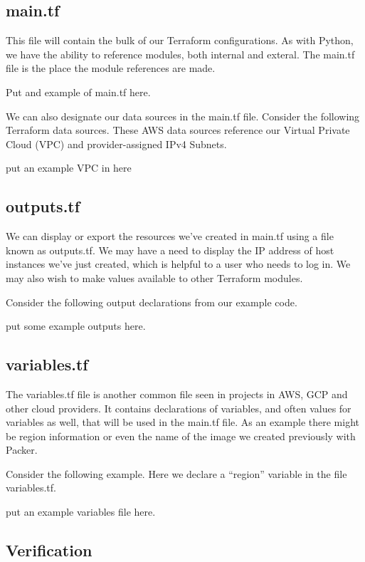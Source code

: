 \subsection{main.tf}

\justify{}
This file will contain the bulk of our Terraform configurations. As with
Python, we have the ability to reference modules, both internal and
exteral. The main.tf file is the place the module references are made.

Put and example of main.tf here.

\justify{}
We can also designate our data sources in the main.tf file. Consider the
following Terraform data sources. These AWS data sources reference our
Virtual Private Cloud (VPC) and provider-assigned IPv4 Subnets.

put an example VPC in here

\subsection{outputs.tf}

\justify{}
We can display or export the resources we've created in main.tf using a
file known as outputs.tf. We may have a need to display the IP address
of host instances we've just created, which is helpful to a user who
needs to log in. We may also wish to make values available to other
Terraform modules.

\justify{}
Consider the following output declarations from our example code.

put some example outputs here.

\subsection{variables.tf}

\justify{}
The variables.tf file is another common file seen in projects in AWS,
GCP and other cloud providers. It contains declarations of variables,
and often values for variables as well, that will be used in the main.tf
file. As an example there might be region information or even the name
of the image we created previously with Packer.

\justify{}
Consider the following example. Here we declare a ``region'' variable in
the file variables.tf.

put an example variables file here.

\subsection{Verification}

